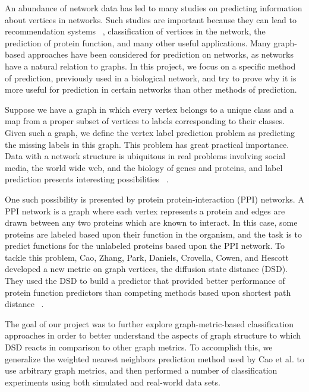 An abundance of network data has led to many studies on predicting information about vertices in networks. Such studies are important because they can lead to recommendation systems ~\cite{huang2004graph}, classification of vertices in the network, the prediction of protein function, and many other useful applications. Many graph-based approaches have been considered for prediction on networks, as networks have a natural relation to graphs. In this project, we focus on a specific method of prediction, previously used in a biological network, and try to prove why it is more useful for prediction in certain networks than other methods of prediction.

Suppose we have a graph in which every vertex belongs to a unique class and a map from a proper
subset of vertices to labels corresponding to their classes. Given such a graph, we define the vertex label prediction problem as
predicting the missing labels in this graph. This problem has great practical importance. Data with a network
structure is ubiquitous in real problems involving social media, the world wide web, and the biology
of genes and proteins, and label prediction presents interesting possibilities ~\cite{FRASCA201384}.

One such possibility is presented by protein protein-interaction (PPI) networks. A PPI network is a
graph where each vertex represents a protein and edges are drawn between any two proteins which are
known to interact. In this case, some proteins are labeled based upon their function in the
organism, and the task is to predict functions for the unlabeled proteins based upon the PPI
network.
To tackle this problem, Cao, Zhang, Park, Daniels, Crovella, Cowen, and Hescott developed a new
metric on graph vertices, the diffusion state distance (DSD). They used the DSD to build a predictor
that provided better performance of protein function predictors than competing methods based upon shortest path distance
~\cite{10.1371/journal.pone.0076339}. %



The goal of our project was to further explore graph-metric-based classification approaches in order to
better understand the aspects of graph structure to which DSD reacts in comparison to other graph metrics. To accomplish this, we
generalize the weighted nearest neighbors prediction method used by Cao et al. to use arbitrary
graph metrics, and then performed a number of classification experiments using both simulated and
real-world data sets.

